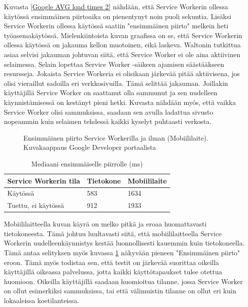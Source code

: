 \documentclass{tktltiki}
\begin{document}
Kuvasta \ref{Google AVG load times 2} nähdään, että Service Workerin ollessa käytössä ensimmäinen piirtoaika on pienentynyt noin puoli sekuntia. Lisäksi Service Workerin ollessa käytössä saatiin "ensimmäinen piirto" melkein heti työasemakäytössä. Mielenkiintoista kuvan graafissa on se, että Service Workerin ollessa käytössä on jakauma kellon muotoinen, eikä laskeva. Waltonin tutkittua asiaa selvisi jakauman johtuvan siitä, että Service Worker ei ole aina aktiivinen selaimessa. Selain lopettaa Service Worker -säikeen ajamisen säästääkseen resursseja. Jokaista Service Workeria ei olisikaan järkevää pitää aktiivisena, jos olisi vieraillut sadoilla eri verkkosivuilla. Tämä selittää jakauman. Joillakin käyttäjillä Service Worker on saattanut olla sammunut ja sen uudelleen käynnistämisessä on kestänyt pieni hetki. Kuvasta  nähdään myös, että vaikka Service Worker olisi sammuksissa, saadaan sen avulla ladattua sivusto nopeammin kuin selaimen tehdessä kaikki kyselyt puhtaasti verkosta. 

\clearpage

\begin{figure}[!htbp]
\begin{center}
\caption{Ensimmäinen piirto Service Workerilla ja ilman (Mobiililaite). Kuvakaappaus Google Developer portaalista \cite{Walton}}
\label{Google AVG load times 3}
\end{center}
\end{figure}

\begin{table}[!htbp]
\centering
\begin{small}
\begin{tabular}{|L{5cm}|L{3cm}|L{3cm}|}
\hline
\textbf{Service Workerin tila} & 
\textbf{Tietokone} &
\textbf{Mobiililaite}
\\ \hline
Käytössä & 
583 &
1634
\\ \hline
Tuettu, ei käytössä &
912 &
1933
\\ \hline
\end{tabular}
\caption{Mediaani ensimmäiselle piirrolle (ms) }
\label{table:median first paint}
\end{small}
\end{table}

Mobiililaitteella kuvan käyrä on melko pitkä ja eroaa huomattavasti tietokoneesta. Tämä johtuu luultavasti siitä, että mobiililaitteella Service Workerin uudelleenkäynnistys kestää luonnollisesti kauemmin kuin tietokoneella. Tämä antaa selityksen myös kuvassa \ref{Google AVG load times 3} näkyvään pieneen "Ensimmäinen piirto" eroon. Tämä myös todistaa sen, että testit on järkevää suorittaa oikeilla käyttäjillä oikeassa palvelussa, jotta kaikki käyttötapaukset tulee otettua huomioon. Oikeilla käyttäjillä saadaan huomioitua tilanne, jossa Service Worker on ollut esimerkiksi sammuksissa, tai että välimuistin tilanne on ollut eri kuin lokaaleissa koetilanteissa.
\end{document}
